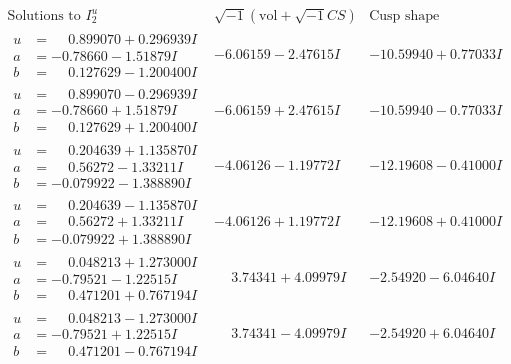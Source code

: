 \documentclass[1p]{elsarticle_modified}
\theoremstyle{definition}
\newcommand{\I}{\sqrt{-1}}
\begin{document}
$$\begin{array}{c|c|c}  
\text{Solutions to }I^u_{2}& \I (\text{vol} + \sqrt{-1}CS) & \text{Cusp shape}\\
 \hline 
\begin{aligned}
u &= \phantom{-}0.899070 + 0.296939 I \\
a &= -0.78660 - 1.51879 I \\
b &= \phantom{-}0.127629 - 1.200400 I\end{aligned}
 & -6.06159 - 2.47615 I & -10.59940 + 0.77033 I \\ \hline\begin{aligned}
u &= \phantom{-}0.899070 - 0.296939 I \\
a &= -0.78660 + 1.51879 I \\
b &= \phantom{-}0.127629 + 1.200400 I\end{aligned}
 & -6.06159 + 2.47615 I & -10.59940 - 0.77033 I \\ \hline\begin{aligned}
u &= \phantom{-}0.204639 + 1.135870 I \\
a &= \phantom{-}0.56272 - 1.33211 I \\
b &= -0.079922 - 1.388890 I\end{aligned}
 & -4.06126 - 1.19772 I & -12.19608 - 0.41000 I \\ \hline\begin{aligned}
u &= \phantom{-}0.204639 - 1.135870 I \\
a &= \phantom{-}0.56272 + 1.33211 I \\
b &= -0.079922 + 1.388890 I\end{aligned}
 & -4.06126 + 1.19772 I & -12.19608 + 0.41000 I \\ \hline\begin{aligned}
u &= \phantom{-}0.048213 + 1.273000 I \\
a &= -0.79521 - 1.22515 I \\
b &= \phantom{-}0.471201 + 0.767194 I\end{aligned}
 & \phantom{-}3.74341 + 4.09979 I & -2.54920 - 6.04640 I \\ \hline\begin{aligned}
u &= \phantom{-}0.048213 - 1.273000 I \\
a &= -0.79521 + 1.22515 I \\
b &= \phantom{-}0.471201 - 0.767194 I\end{aligned}
 & \phantom{-}3.74341 - 4.09979 I & -2.54920 + 6.04640 I \\ \hline\begin{aligned}

\end{aligned}
\end{array}$$
\end{document}
